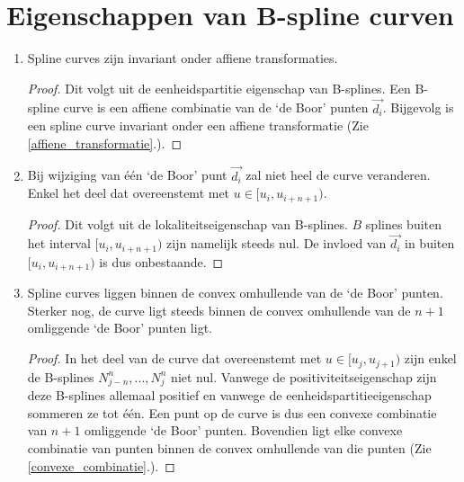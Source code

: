 \documentclass[computergesteund_ontwerp_van_curven_en_oppervlakken.tex]{subfiles}
\begin{document}
\section{Eigenschappen van B-spline curven}
\begin{enumerate}
\item Spline curves zijn invariant onder affiene transformaties.
\begin{proof}
Dit volgt uit de eenheidspartitie eigenschap van B-splines. Een B-spline curve is een affiene combinatie van de `de Boor' punten $\vec{d_i}$. Bijgevolg is een spline curve invariant onder een affiene transformatie (Zie \ref{affiene_transformatie}.).
\end{proof}

\item Bij wijziging van \'e\'en `de Boor' punt $\vec{d_i}$ zal niet heel de curve veranderen. Enkel het deel dat overeenstemt met $u \in [u_i,u_{i+n+1})$.
\begin{proof}
Dit volgt uit de lokaliteitseigenschap van B-splines. $B$ splines buiten het interval $[u_i,u_{i+n+1})$ zijn namelijk steeds nul. De invloed van $\vec{d_i}$ in buiten $[u_i,u_{i+n+1})$ is dus onbestaande.
\end{proof}

\item
Spline curves liggen binnen de convex omhullende van de `de Boor' punten. Sterker nog, de curve ligt steeds binnen de convex omhullende van de $n+1$ omliggende `de Boor' punten ligt.

\begin{proof}
In het deel van de curve dat overeenstemt met $u \in [u_j,u_{j+1})$ zijn enkel de B-splines $N_{j-n}^{n},..., N_{j}^{n}$ niet nul. Vanwege de positiviteitseigenschap zijn deze B-splines allemaal positief en vanwege de eenheidspartitieeigenschap sommeren ze tot \'e\'en. Een punt op de curve is dus een convexe combinatie van $n+1$ omliggende `de Boor' punten. Bovendien ligt elke convexe combinatie van punten binnen de convex omhullende van die punten (Zie \ref{convexe_combinatie}.).
\end{proof}
\end{enumerate}
\end{document}
